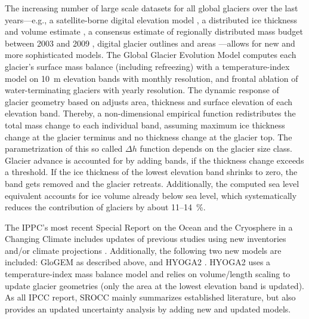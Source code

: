     The increasing number of large scale datasets for all global glaciers over the last years---e.g., a satellite-borne digital elevation model \citep{Jarvis2008}, a distributed ice thickness and volume estimate \citep{Huss2012}, a consensus estimate of regionally distributed mass budget between 2003 and 2009 \citep{Gardner2013}, digital glacier outlines and areas \citep[RGI v4.0,][]{Pfeffer2014}---allows for new and more sophisticated models. The Global Glacier Evolution Model \citep[GloGEM,][]{Huss2015} computes each glacier's surface mass balance (including refreezing) with a temperature-index model on \SI{10}{\meter} elevation bands with monthly resolution, and frontal ablation of water-terminating glaciers with yearly resolution. The dynamic response of glacier geometry based on \citet{Huss2010} adjusts area, thickness and surface elevation of each elevation band. Thereby, a non-dimensional empirical function redistributes the total mass change to each individual band, assuming maximum ice thickness change at the glacier terminus and no thickness change at the glacier top. The parametrization of this so called $\Delta h$ function depends on the glacier size class. Glacier advance is accounted for by adding bands, if the thickness change exceeds a threshold. If the ice thickness of the lowest elevation band shrinks to zero, the band gets removed and the glacier retreats. Additionally, the computed sea level equivalent accounts for ice volume already below sea level, which systematically reduces the contribution of glaciers by about 11--\SI{14}{\percent}.

    The IPPC's most recent Special Report on the Ocean and the Cryosphere in a Changing Climate \citep[SROCC][]{IPCC2019_TS} includes updates of previous studies using new inventories and/or climate projections \citep{Bliss2014,Slangen2017,Hock2019a}. Additionally, the following two new models are included: GloGEM as described above, and HYOGA2 \citet{Hirabayashi2013}. HYOGA2 uses a temperature-index mass balance model and relies on volume/length scaling to update glacier geometries (only the area at the lowest elevation band is updated). As all IPCC report, SROCC mainly summarizes established literature, but also provides an updated uncertainty analysis by adding new and updated models.

